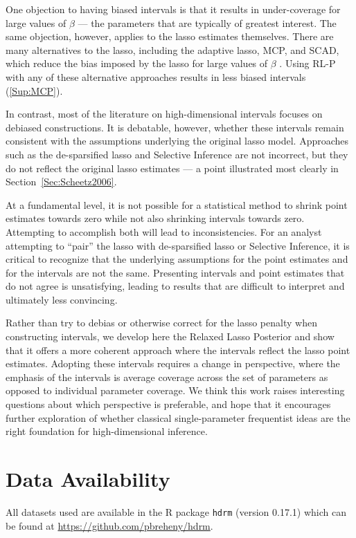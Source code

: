 One objection to having biased intervals is that it results in under-coverage for large values of $\beta$ --- the parameters that are typically of greatest interest. The same objection, however, applies to the lasso estimates themselves. There are many alternatives to the lasso, including the adaptive lasso, MCP, and SCAD, which reduce the bias imposed by the lasso for large values of $\beta$ \citep{Zou2006, Zhang2010, Fan2001}. Using RL-P with any of these alternative approaches results in less biased intervals (\ref{Sup:MCP}).

In contrast, most of the literature on high-dimensional intervals focuses on debiased constructions. It is debatable, however, whether these intervals remain consistent with the assumptions underlying the original lasso model. Approaches such as the de-sparsified lasso and Selective Inference are not incorrect, but they do not reflect the original lasso estimates --- a point illustrated most clearly in Section~\ref{Sec:Scheetz2006}.

At a fundamental level, it is not possible for a statistical method to shrink point estimates towards zero while not also shrinking intervals towards zero. Attempting to accomplish both will lead to inconsistencies. For an analyst attempting to ``pair'' the lasso with de-sparsified lasso or Selective Inference, it is critical to recognize that the underlying assumptions for the point estimates and for the intervals are not the same. Presenting intervals and point estimates that do not agree is unsatisfying, leading to results that are difficult to interpret and ultimately less convincing.

Rather than try to debias or otherwise correct for the lasso penalty when constructing intervals, we develop here the Relaxed Lasso Posterior and show that it offers a more coherent approach where the intervals reflect the lasso point estimates. Adopting these intervals requires a change in perspective, where the emphasis of the intervals is average coverage across the set of parameters as opposed to individual parameter coverage. We think this work raises interesting questions about which perspective is preferable, and hope that it encourages further exploration of whether classical single-parameter frequentist ideas are the right foundation for high-dimensional inference.

\section*{Data Availability}

All datasets used are available in the R package \texttt{hdrm} (version 0.17.1) which can be found at \url{https://github.com/pbreheny/hdrm}.
